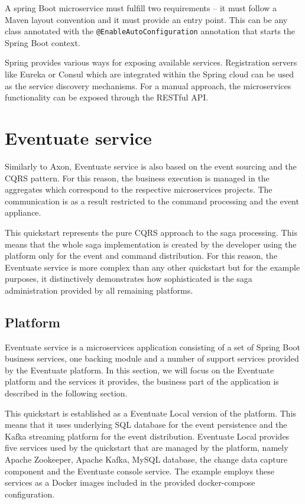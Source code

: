 \documentclass[oneside,
  digital, %
  table,   %
  nolof,     %
  nolot,     %
]{fithesis3}
\begin{document}
A spring Boot microservice must fulfill two requirements -- it must follow a Maven layout convention and it must provide an entry point. This can be any class annotated with the \texttt{@EnableAutoConfiguration} annotation that starts the Spring Boot context.

Spring provides various ways for exposing available services. Registration servers like Eureka or Consul which are integrated within the Spring cloud \cite{spring_cloud} can be used as the service discovery mechanisms. For a manual approach, the microservices functionality can be exposed through the RESTful API.



\section{Eventuate service}

Similarly to Axon, Eventuate service is also based on the event sourcing and the CQRS pattern. For this reason, the business execution is managed in the aggregates which correspond to the respective microservices projects. The communication is as a result restricted to the command processing and the event appliance.

This quickstart represents the pure CQRS approach to the saga processing. This means that the whole saga implementation is created by the developer using the platform only for the event and command distribution. For this reason, the Eventuate service is more complex than any other quickstart but for the example purposes, it distinctively demonstrates how sophisticated is the saga administration provided by all remaining platforms.

\subsection{Platform}
\label{sec:eventuate-platform}

Eventuate service is a microservices application consisting of a set of Spring Boot \cite{spring_boot} business services, one backing module and a number of support services provided by the Eventuate platform. In this section, we will focus on the Eventuate platform and the services it provides, the business part of the application is described in the following section.

This quickstart is established as a Eventuate Local version of the platform. This means that it uses underlying SQL database for the event persistence and the Kafka streaming platform for the event distribution. Eventuate Local provides five services used by the quickstart that are managed by the platform, namely Apache Zookeeper, Apache Kafka, MySQL database, the change data capture component and the Eventuate console service. The example employs these services as a Docker images included in the provided docker-compose configuration.
\end{document}
